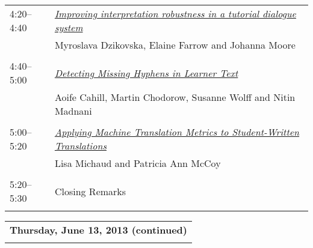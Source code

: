 \begin{tabular}{p{20mm}p{138mm}}
4:20--4:40 & \hyperlink{page.293}{\em Improving interpretation robustness in a tutorial dialogue system}\\
         & Myroslava Dzikovska, Elaine Farrow and Johanna Moore \\
\\

4:40--5:00 & \hyperlink{page.300}{\em Detecting Missing Hyphens in Learner Text}\\
         & Aoife Cahill, Martin Chodorow, Susanne Wolff and Nitin Madnani \\
\\

5:00--5:20 & \hyperlink{page.306}{\em Applying Machine Translation Metrics to Student-Written Translations}\\
         & Lisa Michaud and Patricia Ann McCoy \\
\\

5:20--5:30 & Closing Remarks
 \\
\\
\end{tabular}
\newpage
\begin{tabular}{p{20mm}p{138mm}}
\\
\multicolumn{2}{l}{\bf Thursday, June 13, 2013
 (continued)} \\\\


\end{tabular}

